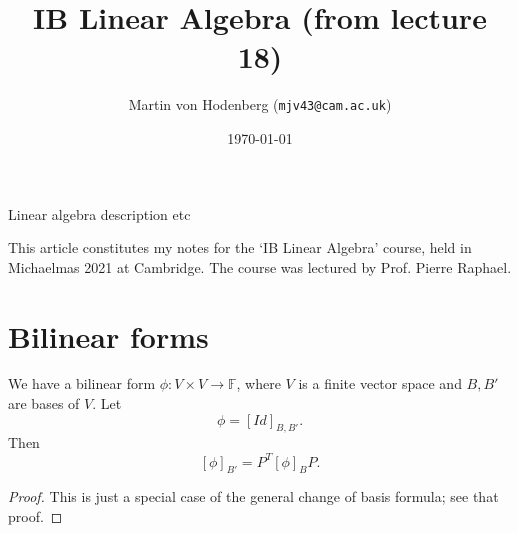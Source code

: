 \documentclass[a4paper]{scrartcl}
\title{IB Linear Algebra (from lecture 18)}
\author{Martin von Hodenberg (\texttt{mjv43@cam.ac.uk})}
\date{\today}
\begin{document}
\maketitle

Linear algebra description etc

This article constitutes my notes for the `IB Linear Algebra' course, held in Michaelmas 2021 at Cambridge. The course was lectured by Prof. Pierre Raphael.


\tableofcontents

\section{Bilinear forms}
\begin{lemma}
    We have a bilinear form $\phi: V \times V \rightarrow \mathbb{F}$, where $V$ is a finite vector space and $B, B'$ are bases of $V$. Let 
    \[\phi=[Id]_{B,B'}.\]
     Then 
    \[[\phi]_{B'}=P^T [\phi]_B P.\]
\end{lemma}
\begin{proof}
     This is just a special case of the general change of basis formula; see that proof.
\end{proof}
\end{document}
